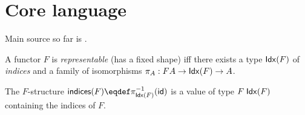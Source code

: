 \section{Core language}

Main source so far is \citet{gibbons17}.




\begin{definition}
   A functor $F$ is \emph{representable} (has a fixed shape) iff there exists a type $\textup{\textsf{Idx}}(F)$ of \emph{indices} and a family of isomorphisms $\pi_A: F A \to \textup{\textsf{Idx}}(F) \to A$.
\end{definition}

The $F$-structure $\mathSf{indices}(F) \eqdef \pi_{\Idx{F}}^{-1}(\id)$ is a value of type $F\;\textup{\textsf{Idx}}(F)$ containing the indices of $F$.


